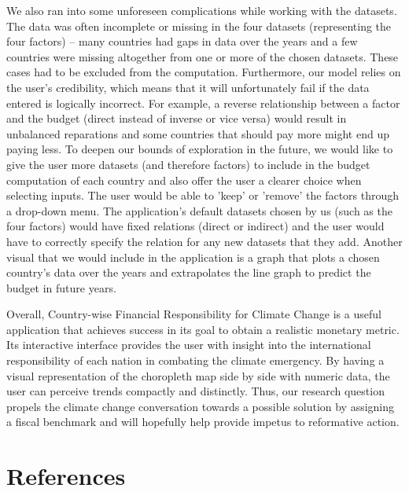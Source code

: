 \documentclass[fontsize=11pt]{article}
\begin{document}
    We also ran into some unforeseen complications while working with the datasets. The data was often incomplete or missing in the 
    four datasets (representing the four factors) – many countries had gaps in data over the years and a few countries were missing 
    altogether from one or more of the chosen datasets. These cases had to be excluded from the computation. Furthermore, our model 
    relies on the user’s credibility, which means that it will unfortunately fail if the data entered is logically incorrect. 
    For example, a reverse relationship between a factor and the budget (direct instead of inverse or vice versa) would result in 
    unbalanced reparations and some countries that should pay more might end up paying less. To deepen our bounds of exploration in the future, 
    we would like to give the user more datasets (and therefore factors) to include in the budget computation of each country 
    and also offer the user a clearer choice when selecting inputs. The user would be able to 'keep' or 'remove' the factors through a drop-down menu. 
    The application's default datasets chosen by us (such as the four factors) would have fixed relations (direct or indirect) 
    and the user would have to correctly specify the relation for any new datasets that they add. Another visual that we would include 
    in the application is a graph that plots a chosen country’s data over the years and extrapolates the line graph to predict the budget in future years.
    \newline
    
    Overall, Country-wise Financial Responsibility for Climate Change is a useful application that achieves success in its goal 
    to obtain a realistic monetary metric. Its interactive interface provides 
    the user with insight into the international responsibility of each nation in combating the climate emergency. By having a visual representation 
    of the choropleth map side by side with numeric data, the user can perceive trends compactly and distinctly. Thus, our research question 
    propels the climate change conversation towards a possible solution by assigning a fiscal benchmark and will hopefully 
    help provide impetus to reformative action.
    \newline

    \section*{References}
\end{document}
